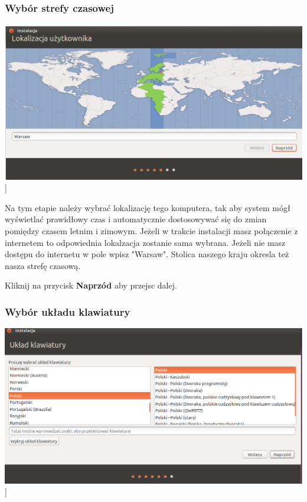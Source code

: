 \subsubsection{Wybór strefy czasowej}
\begin{center}
	\includegraphics[scale=0.5]{images/instalator_czas.png}]
\end{center}
Na tym etapie należy wybrać lokalizację tego komputera, tak aby system mógł wyświetlać prawidłowy czas i automatycznie dostosowywać się do zmian pomiędzy czasem letnim i zimowym. Jeżeli w trakcie instalacji masz połączenie z internetem to odpowiednia lokalzacja zostanie sama wybrana. Jeżeli nie masz dostępu do internetu w pole wpisz "Warsaw". Stolica naszego kraju okresla też nasza strefę czasową.

\begin{flushright}
Kliknij na przycisk \textbf{Naprzód} aby przejsc dalej.
\end{flushright}
\clearpage

\subsubsection{Wybór układu klawiatury}
\begin{center}
	\includegraphics[scale=0.5]{images/instalator_klawiatura.png}]
\end{center}

